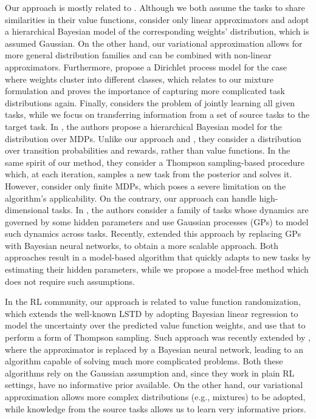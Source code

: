 \documentclass{article}
\begin{document}
Our approach is mostly related to \cite{lazaric2010bayesian}. Although we both assume the tasks to share similarities in their value functions, \cite{lazaric2010bayesian} consider only linear approximators and adopt a hierarchical Bayesian model of the corresponding weights' distribution, which is assumed Gaussian. On the other hand, our variational approximation allows for more general distribution families and can be combined with non-linear approximators. Furthermore, \cite{lazaric2010bayesian} propose a Dirichlet process model for the case where weights cluster into different classes, which relates to our mixture formulation and proves the importance of capturing more complicated task distributions again. Finally, \cite{lazaric2010bayesian} considers the problem of jointly learning all given tasks, while we focus on transferring information from a set of source tasks to the target task. In \cite{wilson2007multi}, the authors propose a hierarchical Bayesian model for the distribution over MDPs. Unlike our approach and \cite{lazaric2010bayesian}, they consider a distribution over transition probabilities and rewards, rather than value functions. In the same spirit of our method, they consider a Thompson sampling-based procedure which, at each iteration, samples a new task from the posterior and solves it. However, \cite{wilson2007multi} consider only finite MDPs, which poses a severe limitation on the algorithm's applicability. On the contrary, our approach can handle high-dimensional tasks. In \cite{doshi2016hidden}, the authors consider a family of tasks whose dynamics are governed by some hidden parameters and use Gaussian processes (GPs) to model such dynamics across tasks. Recently, \cite{killian2017robust} extended this approach by replacing GPs with Bayesian neural networks, to obtain a more scalable approach. Both approaches result in a model-based algorithm that quickly adapts to new tasks by estimating their hidden parameters, while we propose a model-free method which does not require such assumptions.

In the RL community, our approach is related to value function randomization\cite{osband2014generalization}, which extends the well-known LSTD \cite{boyan1999least} by adopting Bayesian linear regression to model the uncertainty over the predicted value function weights, and use that to perform a form of Thompson sampling. Such approach was recently extended by \cite{azizzadenesheli2018efficient}, where the approximator is replaced by a Bayesian neural network, leading to an algorithm capable of solving much more complicated problems. Both these algorithms rely on the Gaussian assumption and, since they work in plain RL settings, have no informative prior available. On the other hand, our variational approximation allows more complex distributions (e.g., mixtures) to be adopted, while knowledge from the source tasks allows us to learn very informative priors.
\end{document}
